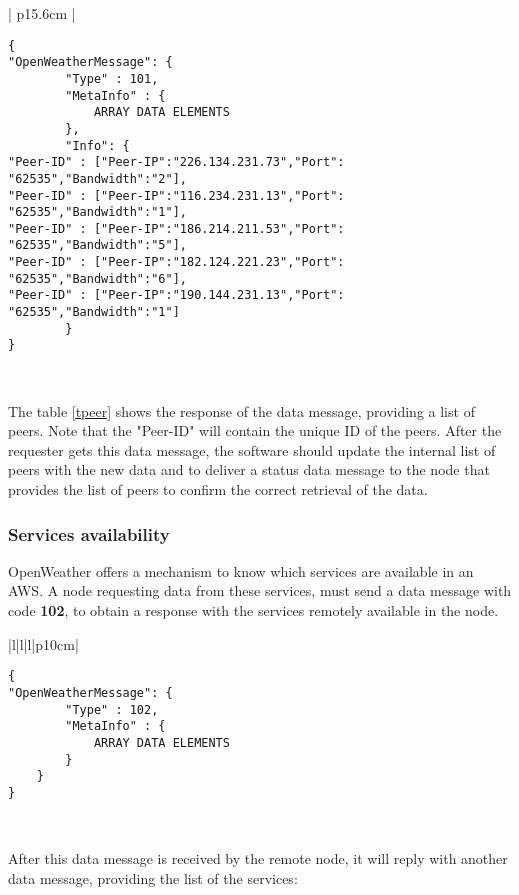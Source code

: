 \begin{table}[H]
\centering
\begin{tabular}{| p{15.6cm} |}
\hline
\begin{minipage}[t]{\linewidth}
	\begin{verbatim}
{
"OpenWeatherMessage": {
        "Type" : 101,
        "MetaInfo" : {
            ARRAY DATA ELEMENTS
        },
        "Info": {
"Peer-ID" : ["Peer-IP":"226.134.231.73","Port": "62535","Bandwidth":"2"],
"Peer-ID" : ["Peer-IP":"116.234.231.13","Port": "62535","Bandwidth":"1"],
"Peer-ID" : ["Peer-IP":"186.214.211.53","Port": "62535","Bandwidth":"5"],
"Peer-ID" : ["Peer-IP":"182.124.221.23","Port": "62535","Bandwidth":"6"],
"Peer-ID" : ["Peer-IP":"190.144.231.13","Port": "62535","Bandwidth":"1"]
        }
}
\end{verbatim}
\end{minipage} \\
\hline
\end{tabular}
\caption{Peer's list exchange in OpenWeather protocol.}
\label{tpeer}
\end{table}

The table \ref{tpeer} shows the response of the data message, providing a list of peers. Note that the "Peer-ID" will contain the unique ID of the peers. After the requester gets this data message, the software should update the internal list of peers with the new data and to deliver a status data message to the node that provides the list of peers to confirm the correct retrieval of the data.

\subsubsection{Services availability}

OpenWeather offers a mechanism to know which services are available in an \gls{AWS}. A node requesting data from these services, must send a data message with code \textbf{102}, to obtain a response with the services remotely available in the node.

\begin{table}[H]
\centering
\begin{tabular}{|l|l|l|p{10cm}|}
\hline
\begin{minipage}[t]{\linewidth}
	\begin{verbatim}
{
"OpenWeatherMessage": {
        "Type" : 102,
        "MetaInfo" : {
            ARRAY DATA ELEMENTS
        }
    }
}
\end{verbatim}
\end{minipage} \\
\hline
\end{tabular}
\caption{Services list availability request.}
\end{table}
After this data message is received by the remote node, it will reply with another data message, providing the list of the services:

